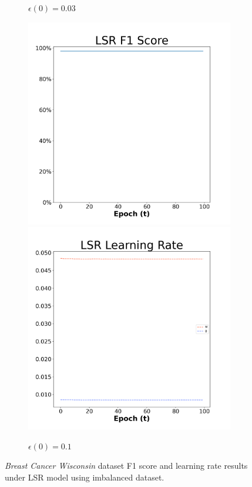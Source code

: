 \begin{figure}[H]
\begin{subfigure}{0.3\textwidth}
  \caption{$\epsilon(0)=0.03$}
\end{subfigure}\hfil %
\begin{subfigure}{0.3\textwidth}
  \includegraphics[width=\linewidth]{images/exper2/breast/LSR_0.1_f1.png}
  \includegraphics[width=\linewidth]{images/exper2/breast/LSR_0.1_lr.png}
  \caption{$\epsilon(0)=0.1$}
\end{subfigure}

\caption{\textit{Breast Cancer Wisconsin} dataset F1 score and learning rate results under LSR model using imbalanced dataset.}
\end{figure}


